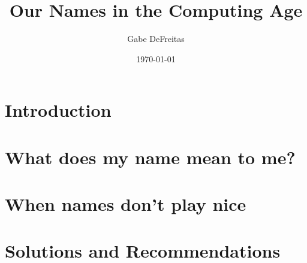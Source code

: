 \documentclass{report}
\title{Our Names in the Computing Age}
\author{Gabe DeFreitas}
\date{\today}
\begin{document}
\maketitle
\tableofcontents

\chapter{Introduction}



\chapter{What does my name mean to me?}




\chapter{When names don't play nice}




\chapter{Solutions and Recommendations}



\printbibliography
\end{document}
